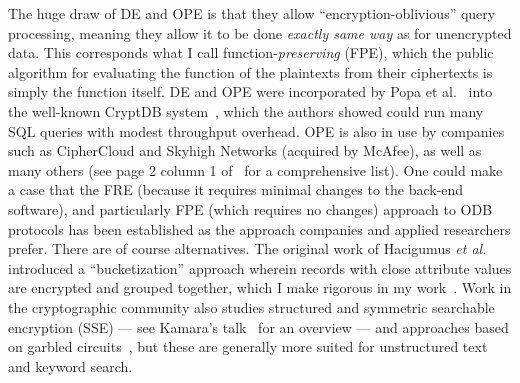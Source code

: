 \begin{itemize}
  \end{itemize} 
  
  

The huge draw of DE and OPE is that they allow ``encryption-oblivious'' query processing, meaning they allow it to be done   \emph{exactly same way} as for unencrypted data. This corresponds what I call function-\emph{preserving} (FPE), which the public algorithm for evaluating the function of the plaintexts from their ciphertexts is simply the function itself.   DE and OPE were incorporated by Popa et al.~\cite{PRZB11} into the well-known CryptDB system~\cite{PRZB11}, which the authors showed could run many SQL queries with modest throughput overhead.  OPE is also in use by companies such as CipherCloud and Skyhigh Networks (acquired by McAfee), as well as many others (see page 2 column 1 of~\cite{FVYSHGSMC17} for a comprehensive list).  One could make a case that the FRE (because it requires minimal changes to the back-end software), and particularly FPE (which requires no changes) approach to ODB protocols has been established as the approach companies and applied researchers prefer.  There are of course alternatives. The original work of Hacigumus \emph{et al.}~\cite{Hacigumus:2002} introduced a ``bucketization'' approach wherein records with close attribute values are encrypted and grouped together, which I make rigorous in my work~\cite{KKNO17}.  %
Work in the cryptographic community also studies structured and symmetric searchable encryption (SSE) --- see Kamara's talk~\cite{kamara15} for an overview --- and approaches based on garbled circuits~\cite{SP:PKVKMCGKB14,SP:FVKKKMB15}, but these are generally more suited for unstructured text and keyword search.

